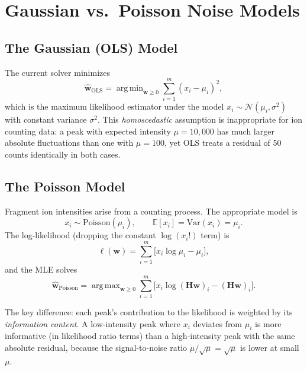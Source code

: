 \documentclass[11pt,a4paper]{article}
\newcommand{\E}{\mathbb{E}}
\newcommand{\Var}{\mathrm{Var}}
\DeclareMathOperator*{\argmin}{arg\,min}
\DeclareMathOperator*{\argmax}{arg\,max}
\begin{document}
\section{Gaussian vs.\ Poisson Noise Models}
\label{sec:noise-models}

\subsection{The Gaussian (OLS) Model}

The current solver minimizes
\begin{equation}
    \hat{\mathbf{w}}_{\text{OLS}} = \argmin_{\mathbf{w} \geq 0}
    \sum_{i=1}^{m} (x_i - \mu_i)^2,
\end{equation}
which is the maximum likelihood estimator under the model
$x_i \sim \mathcal{N}(\mu_i, \sigma^2)$ with constant variance $\sigma^2$. This
\emph{homoscedastic} assumption is inappropriate for ion counting data: a peak with
expected intensity $\mu = 10{,}000$ has much larger absolute fluctuations than one with
$\mu = 100$, yet OLS treats a residual of 50 counts identically in both cases.

\subsection{The Poisson Model}

Fragment ion intensities arise from a counting process. The appropriate model is
\begin{equation}
    x_i \sim \mathrm{Poisson}(\mu_i), \qquad \E[x_i] = \Var(x_i) = \mu_i.
\end{equation}
The log-likelihood (dropping the constant $\log(x_i!)$ term) is
\begin{equation}
    \ell(\mathbf{w}) = \sum_{i=1}^{m} \bigl[ x_i \log \mu_i - \mu_i \bigr],
    \label{eq:poisson-ll}
\end{equation}
and the MLE solves
\begin{equation}
    \hat{\mathbf{w}}_{\text{Poisson}} = \argmax_{\mathbf{w} \geq 0}
    \sum_{i=1}^{m} \bigl[ x_i \log(\mathbf{H}\mathbf{w})_i - (\mathbf{H}\mathbf{w})_i \bigr].
\end{equation}

The key difference: each peak's contribution to the likelihood is weighted by its
\emph{information content}. A low-intensity peak where $x_i$ deviates from $\mu_i$ is
more informative (in likelihood ratio terms) than a high-intensity peak with the same
absolute residual, because the signal-to-noise ratio $\mu/\sqrt{\mu} = \sqrt{\mu}$
is lower at small $\mu$.
\end{document}
